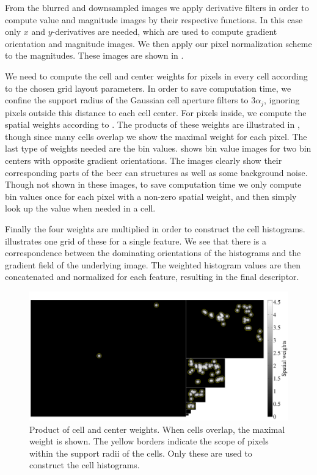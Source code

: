 \documentclass[thesis.tex]{subfiles}
\begin{document}
From the blurred and downsampled images we apply derivative filters in order to compute value and magnitude images by their respective functions. In this case only $x$ and $y$-derivatives are needed, which are used to compute gradient orientation and magnitude images. We then apply our pixel normalization scheme to the magnitudes. These images are shown in .

We need to compute the cell and center weights for pixels in every cell according to the chosen grid layout parameters. In order to save computation time, we confine the support radius of the Gaussian cell aperture filters to $3 \alpha_j$, ignoring pixels outside this distance to each cell center. For pixels inside, we compute the spatial weights according to . The products of these weights are illustrated in , though since many cells overlap we show the maximal weight for each pixel.
The last type of weights needed are the bin values.  shows bin value images for two bin centers with opposite gradient orientations. The images clearly show their corresponding parts of the beer can structures as well as some background noise. Though not shown in these images, to save computation time we only compute bin values once for each pixel with a non-zero spatial weight, and then simply look up the value when needed in a cell.


Finally the four weights are multiplied in order to construct the cell histograms.  illustrates one grid of these for a single feature. We see that there is a correspondence between the dominating orientations of the histograms and the gradient field of the underlying image. The weighted histogram values are then concatenated and normalized for each feature, resulting in the final descriptor.

\begin{figure}[tb]
    \centering
    \includegraphics[width=\textwidth]{img/cellHistScaleSpacesSpatialWeights.pdf}
    \caption{Product of cell and center weights. When cells overlap, the maximal weight is shown. The yellow borders indicate the scope of pixels within the support radii of the cells. Only these are used to construct the cell histograms.}
    \label{fig:cellHistScaleSpacesSpatialWeights}
\end{figure}
\end{document}
